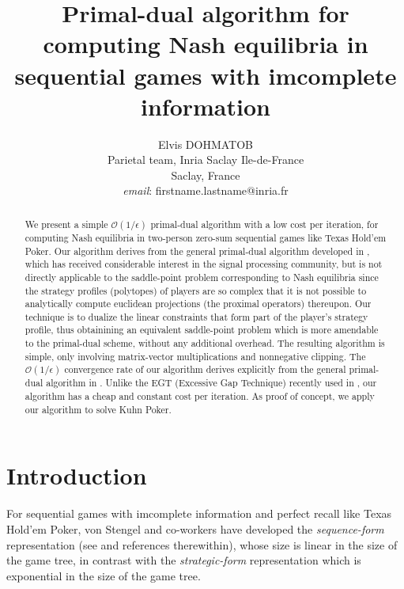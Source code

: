 \documentclass{article} %
\author{
Elvis DOHMATOB
\\
Parietal team, Inria Saclay Ile-de-France\\
Saclay, France\\
\textit{email}: firstname.lastname@inria.fr}
\title{Primal-dual algorithm for computing Nash equilibria in
sequential games with imcomplete information
}
\begin{document}
\maketitle

\begin{abstract}
We present a simple $\mathcal{O}(1/\epsilon)$ primal-dual algorithm with a low cost per iteration, for computing Nash equilibria in two-person zero-sum sequential games like Texas Hold'em Poker. %
Our algorithm derives from the general primal-dual algorithm developed
in \cite{chambolle2010}, which has received considerable interest in the signal processing community, but is not directly applicable to the saddle-point problem corresponding to Nash equilibria since the strategy profiles (polytopes) of players are so complex that it is not possible
 to analytically compute
euclidean
 projections (the proximal operators) thereupon.
Our technique is to dualize the linear constraints that form part of the player's strategy profile, thus obtainining an equivalent saddle-point problem which is more amendable to the primal-dual scheme, without any additional overhead. The resulting algorithm is simple, only involving matrix-vector multiplications
and nonnegative clipping.
The $\mathcal{O}(1/\epsilon)$ convergence rate of our algorithm derives explicitly from the general primal-dual algorithm in \cite{chambolle2010}. Unlike the EGT (Excessive Gap Technique) recently used in \cite{hoda2010smoothing}, our algorithm has a cheap and constant cost per iteration. As proof of concept, we apply our algorithm to solve Kuhn Poker.
\end{abstract}

\section{Introduction}
\label{sec:intro}
For sequential games with imcomplete information and perfect recall like Texas Hold'em Poker, von Stengel and co-workers have developed the \textit{sequence-form} representation (see \cite{von1996efficient} and references therewithin), whose size is linear in the size of the game tree, in contrast with the \textit{strategic-form} representation which is exponential in the size of the game tree.
\end{document}
